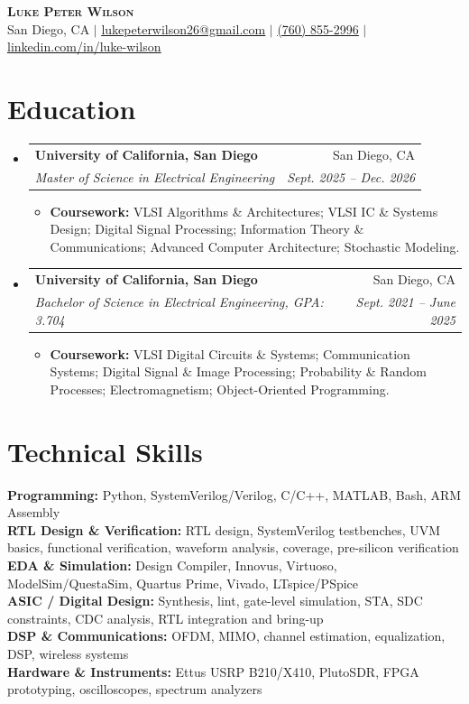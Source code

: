 \documentclass[letterpaper,10pt]{article}
\makeatletter
\newcommand{\resumeItem}[1]{\item \small{#1}}
\newcommand{\resumeSubheading}[4]{
  \vspace{1pt}\item
    \begin{tabular*}{0.97\textwidth}[t]{l@{\extracolsep{\fill}}r}
      \textbf{#1} & #2 \\
      \textit{\small #3} & \textit{\small #4} \\
    \end{tabular*}\vspace{-1pt}
}
\newcommand{\resumeItemListStart}{\begin{itemize}[leftmargin=0.18in, itemsep=1pt, topsep=2pt]}
\newcommand{\resumeItemListEnd}{\end{itemize}\vspace{-2pt}}
\newcommand{\resumeSubHeadingListStart}{\begin{itemize}[leftmargin=0.15in, label={}]}
\newcommand{\resumeSubHeadingListEnd}{\end{itemize}\vspace{-1pt}}
\makeatother
\begin{document}
\begin{center}
    \textbf{\Huge \scshape Luke Peter Wilson} \\ \vspace{2pt}
    \small San Diego, CA $|$
    \href{mailto:lukepeterwilson26@gmail.com}{\underline{lukepeterwilson26@gmail.com}} $|$
    \href{tel:+17608552996}{\underline{(760) 855-2996}} $|$
    \href{https://www.linkedin.com/in/luke-wilson-33718b238/}{\underline{linkedin.com/in/luke-wilson}}
\end{center}

\section{Education}
\resumeSubHeadingListStart
  \resumeSubheading
    {University of California, San Diego}{San Diego, CA}
    {Master of Science in Electrical Engineering}{Sept. 2025 -- Dec. 2026}
    \resumeItemListStart
      \resumeItem{\textbf{Coursework:} VLSI Algorithms \& Architectures; VLSI IC \& Systems Design; Digital Signal Processing; Information Theory \& Communications; Advanced Computer Architecture; Stochastic Modeling.}
    \resumeItemListEnd

  \resumeSubheading
    {University of California, San Diego}{San Diego, CA}
    {Bachelor of Science in Electrical Engineering, GPA: 3.704}{Sept. 2021 -- June 2025}
    \resumeItemListStart
      \resumeItem{\textbf{Coursework:} VLSI Digital Circuits \& Systems; Communication Systems; Digital Signal \& Image Processing; Probability \& Random Processes; Electromagnetism; Object-Oriented Programming.}
    \resumeItemListEnd
\resumeSubHeadingListEnd

\section{Technical Skills}
\begin{itemize}[leftmargin=0.15in, label={}]
  \small{\item{
    \textbf{Programming:} Python, SystemVerilog/Verilog, C/C++, MATLAB, Bash, ARM Assembly \\
    \textbf{RTL Design \& Verification:} RTL design, SystemVerilog testbenches, UVM basics, functional verification, waveform analysis, coverage, pre-silicon verification \\
    \textbf{EDA \& Simulation:} Design Compiler, Innovus, Virtuoso, ModelSim/QuestaSim, Quartus Prime, Vivado, LTspice/PSpice \\
    \textbf{ASIC / Digital Design:} Synthesis, lint, gate-level simulation, STA, SDC constraints, CDC analysis, RTL integration and bring-up \\
    \textbf{DSP \& Communications:} OFDM, MIMO, channel estimation, equalization, DSP, wireless systems \\
    \textbf{Hardware \& Instruments:} Ettus USRP B210/X410, PlutoSDR, FPGA prototyping, oscilloscopes, spectrum analyzers
  }}
\end{itemize}
\end{document}
